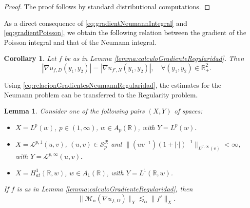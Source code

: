 \documentclass[12pt]{amsart}
\newcommand{\R}{\mathbb{R}}
\theoremstyle{plain}
\newtheorem{corollary}[theorem]{Corollary}
\newtheorem{lemma}[theorem]{Lemma}
\theoremstyle{definition}
\numberwithin{equation}{section}
\begin{document}
\begin{proof} The proof follows by standard distributional computations. 
\end{proof} 

As a direct consequence of \eqref{eq:gradientNeumannIntegral} and \eqref{eq:gradientPoisson}, we obtain the following relation between the gradient of the Poisson integral and that of the Neumann integral. 

\begin{corollary}\label{corol:relacionNeumannRegularidad}
    Let $f$ be as in Lemma \ref{lemma:calculoGradienteRegularidad}. Then
    \begin{equation}\label{eq:relacionGradientesNeumannRegularidad}
        |\nabla u_{f,D}(y_1,y_2)|
        =
        |\nabla u_{f',N}(y_1,y_2)|,\quad \forall (y_1,y_2)\in\R_{+}^{2}.
    \end{equation}
\end{corollary}

Using \eqref{eq:relacionGradientesNeumannRegularidad}, the estimates for the Neumann problem can be transferred to the Regularity problem. 

\begin{lemma}\label{lemma:solvabilityRegularityProblemHalfPlane}
    Consider one of the following pairs $(X,Y)$ of spaces:
    \begin{itemize}
        \item $X=L^p(w)$, $p\in (1,\infty)$, $w\in A_p(\R)$, with $Y=L^p(w)$.
        \item $X=\mathcal{L}^{p,1}(u,v)$, $(u,v)\in \mathcal{S}_p^{\mathcal{R}}$ and $\|(uv^{-1})(1+|\cdot|)^{-1}\|_{L^{p',\infty}(v)}<\infty$,
        with $Y=\mathcal{L}^{p,\infty}(u,v)$. 
        \item $X=H_{at}^{1}(\R,w)$, $w\in A_1(\R)$, with $Y=L^1(\R,w)$.
    \end{itemize}
    If $f$ is as in Lemma \ref{lemma:calculoGradienteRegularidad}, then
    \[
    \|\mathcal{M}_{\alpha}(\nabla u_{f,D})\|_{Y}
    \lesssim_{\alpha}
    \|f'\|_{X}.
    \]
\end{lemma}
\end{document}
